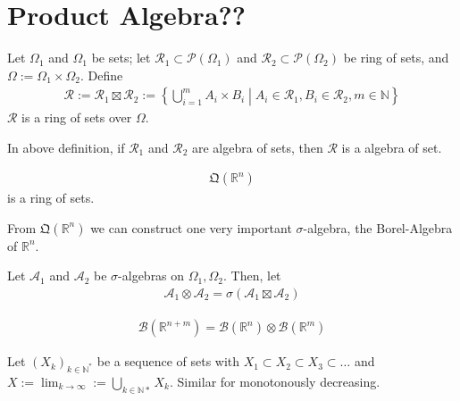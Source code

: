 \section{Product Algebra??}
\begin{definition}
    Let \(\Omega_1\) and \(\Omega_1\) be sets; let \(\mathcal{R}_1 \subset \mathcal{P}(\Omega_1)\) and \(\mathcal{R}_2 \subset \mathcal{P}(\Omega_2)\) be ring of sets, and \(\Omega := \Omega_1 \times \Omega_2\). Define
    \begin{align}
        \mathcal{R} := \mathcal{R}_1 \boxtimes \mathcal{R}_2 := \left\{ \bigcup_{i=1}^m A_i \times B_i \middle| A_i \in \mathcal{R}_1, B_i \in \mathcal{R}_2, m \in \mathbb{N} \right\}
    \end{align}
    \(\mathcal{R}\) is a ring of sets over \(\Omega\).
\end{definition}
\begin{theorem}
    In above definition, if \(\mathcal{R}_1\) and \(\mathcal{R}_2\) are algebra of sets, then \(\mathcal{R}\) is a algebra of set.
\end{theorem}
\begin{theorem}
    \begin{align}
        \mathfrak{Q}(\mathbb{R}^n)
    \end{align}
    is a ring of sets.
\end{theorem}
\begin{remark}
    From \(\mathfrak{Q}(\mathbb{R}^n)\) we can construct one very important \(\sigma\)-algebra, the Borel-Algebra of \(\mathbb{R}^n\).
\end{remark}
\begin{definition}
    Let \(\mathcal{A}_1\) and \(\mathcal{A}_2\) be \(\sigma\)-algebras on \(\Omega_1, \Omega_2\). Then, let
    \begin{align}
        \mathcal{A}_1 \otimes \mathcal{A}_2 = \sigma( \mathcal{A}_1 \boxtimes \mathcal{A}_2 )
    \end{align}
\end{definition}
\begin{example}
    \begin{align}
        \mathcal{B}(\mathbb{R}^{n+m}) = \mathcal{B}(\mathbb{R}^n) \otimes \mathcal{B}(\mathbb{R}^m)
    \end{align}
\end{example}
\begin{definition}
    Let \((X_k)_{k \in \mathbb{N}^*}\) be a sequence of sets with \(X_1 \subset X_2 \subset X_3 \subset \dots \) and \(X := \lim_{k \rightarrow \infty} := \bigcup_{k \in \mathbb{N}*} X_k\).
    Similar for monotonously decreasing.
\end{definition}
%
%
%
%
%
